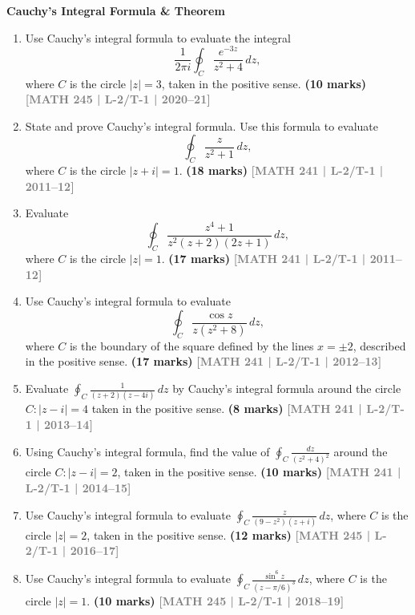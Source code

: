 \documentclass[12pt,a4paper]{article}
\newcommand{\yr}[1]{\hfill\textcolor{gray}{\small\textbf{[#1]}}}
\newcommand{\mk}[1]{\textcolor{orange!70!black}{\small\textbf{(#1 marks)}}}
\newcommand{\subtopic}[2]{%
  \vspace{10pt}
  \noindent\begin{tcolorbox}[colback=#1!8,colframe=#1,boxrule=0.6pt,arc=4pt,
    left=6pt,right=6pt,top=4pt,bottom=4pt]
    \small\bfseries\textcolor{#1}{#2}
  \end{tcolorbox}
  \vspace{2pt}
}
\begin{document}
\subtopic{cE}{Cauchy's Integral Formula \& Theorem}
\label{sub:s5-cauchy}

\begin{enumerate}

\item Use Cauchy's integral formula to evaluate the integral
\[
\frac{1}{2\pi i}\oint_{C} \frac{e^{-3z}}{z^{2}+4}\,dz,
\]
where $C$ is the circle $|z|=3$, taken in the positive sense.
\mk{10} \yr{MATH 245 | L-2/T-1 | 2020--21}

\item State and prove Cauchy's integral formula. Use this formula to evaluate
\[
\oint_{C} \frac{z}{z^{2}+1}\,dz,
\]
where $C$ is the circle $|z+i|=1$.
\mk{18} \yr{MATH 241 | L-2/T-1 | 2011--12}

\item Evaluate
\[
\oint_{C} \frac{z^{4}+1}{z^{2}(z+2)(2z+1)}\,dz,
\]
where $C$ is the circle $|z|=1$.
\mk{17} \yr{MATH 241 | L-2/T-1 | 2011--12}

\item Use Cauchy's integral formula to evaluate
\[
\oint_{C} \frac{\cos z}{z(z^{2}+8)}\,dz,
\]
where $C$ is the boundary of the square defined by the lines $x=\pm 2$, described in the positive sense.
\mk{17} \yr{MATH 241 | L-2/T-1 | 2012--13}

\item Evaluate $\displaystyle\oint_{C} \frac{1}{(z+2)(z-4i)}\,dz$ by Cauchy's integral formula around the circle $C\colon |z-i|=4$ taken in the positive sense.
\mk{8} \yr{MATH 241 | L-2/T-1 | 2013--14}

\item Using Cauchy's integral formula, find the value of $\displaystyle\oint_{C}\frac{dz}{(z^{2}+4)^{2}}$ around the circle $C\colon|z-i|=2$, taken in the positive sense.
\mk{10} \yr{MATH 241 | L-2/T-1 | 2014--15}

\item Use Cauchy's integral formula to evaluate $\displaystyle\oint_{C}\frac{z}{(9-z^{2})(z+i)}\,dz$, where $C$ is the circle $|z|=2$, taken in the positive sense.
\mk{12} \yr{MATH 245 | L-2/T-1 | 2016--17}

\item Use Cauchy's integral formula to evaluate $\displaystyle\oint_{C}\frac{\sin^{6}z}{(z-\pi/6)^{3}}\,dz$, where $C$ is the circle $|z|=1$.
\mk{10} \yr{MATH 245 | L-2/T-1 | 2018--19}

\end{enumerate}
\end{document}
